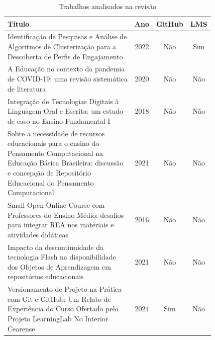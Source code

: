 \documentclass{article}
\begin{document}
	
	\begin{table}[htbp]
		\centering
		\caption{Trabalhos analisados na revisão}
		\label{tab:trabalhos}
		\footnotesize
		\setlength{\tabcolsep}{4pt}
		\renewcommand{\arraystretch}{1.2}
		\begin{tabular}{p{7cm} c c c}
			\toprule
			\textbf{Título} & \textbf{Ano} & \textbf{GitHub} & \textbf{LMS} \\
			\midrule
			\makecell[l]{Identificação de Pesquisas e Análise de \\ Algoritmos de Clusterização para a \\ Descoberta de Perfis de Engajamento} & 2022 & Não & Sim \\
			\midrule
			\makecell[l]{A Educação no contexto da pandemia \\ de COVID-19: uma revisão sistemática \\ de literatura} & 2020 & Não & Não \\
			\midrule
			\makecell[l]{Integração de Tecnologias Digitais à \\ Linguagem Oral e Escrita: um estudo \\ de caso no Ensino Fundamental I} & 2018 & Não & Não \\
			\midrule
			\makecell[l]{Sobre a necessidade de recursos \\ educacionais para o ensino do \\ Pensamento Computacional na \\ Educação Básica Brasileira: discussão \\ e concepção de Repositório \\ Educacional do Pensamento \\ Computacional} & 2021 & Não & Não \\
			\midrule
			\makecell[l]{Small Open Online Course com \\ Professores do Ensino Médio: desafios \\ para integrar REA nos materiais e \\ atividades didáticas} & 2016 & Não & Não \\
			\midrule
			\makecell[l]{Impacto da descontinuidade da \\ tecnologia Flash na disponibilidade \\ dos Objetos de Aprendizagem em \\ repositórios educacionais} & 2021 & Não & Não \\
			\midrule
			\makecell[l]{Versionamento de Projeto na Prática \\ com Git e GitHub: Um Relato de \\ Experiência do Curso Ofertado pelo \\ Projeto LearningLab No Interior \\ Cearense} & 2024 & Sim & Não \\

\end{tabular}
\end{table}
\end{document}
